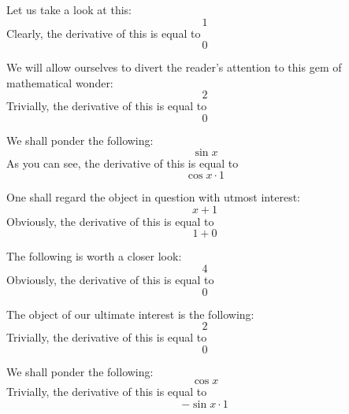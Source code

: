\documentclass{article}
\begin{document}
Let us take a look at this:
\begin{equation}
1 
\end{equation}
Clearly, the derivative of this is equal to
\begin{equation}
0 
\end{equation}

We will allow ourselves to divert the reader's attention to this gem of mathematical wonder:
\begin{equation}
2 
\end{equation}
Trivially, the derivative of this is equal to
\begin{equation}
0 
\end{equation}

We shall ponder the following:
\begin{equation}
\sin x 
\end{equation}
As you can see, the derivative of this is equal to
\begin{equation}
\cos x \cdot 1 
\end{equation}

One shall regard the object in question with utmost interest:
\begin{equation}
x + 1 
\end{equation}
Obviously, the derivative of this is equal to
\begin{equation}
1 + 0 
\end{equation}

The following is worth a closer look:
\begin{equation}
4 
\end{equation}
Obviously, the derivative of this is equal to
\begin{equation}
0 
\end{equation}

The object of our ultimate interest is the following:
\begin{equation}
2 
\end{equation}
Trivially, the derivative of this is equal to
\begin{equation}
0 
\end{equation}

We shall ponder the following:
\begin{equation}
\cos x 
\end{equation}
Trivially, the derivative of this is equal to
\begin{equation}
-\sin x \cdot 1 
\end{equation}
\end{document}
